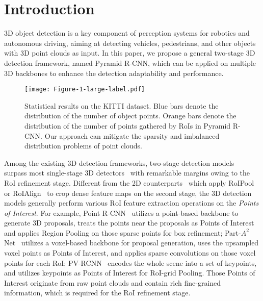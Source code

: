 \documentclass[10pt,twocolumn,letterpaper]{article}
\begin{document}
\section{Introduction}
3D object detection is a key component of perception systems for robotics and autonomous driving, aiming at detecting vehicles, pedestrians, and other objects with 3D point clouds as input. In this paper, we propose a general two-stage 3D detection framework, named Pyramid R-CNN, which can be applied on multiple 3D backbones to enhance the detection adaptability and performance.

\begin{figure}[!t]
\centering
\texttt{[image: Figure-1-large-label.pdf]}
\caption{Statistical results on the KITTI dataset. Blue bars denote the distribution of the number of object points. Orange bars denote the distribution of the number of points gathered by RoIs in Pyramid R-CNN. Our approach can mitigate the sparsity and imbalanced distribution problems of point clouds.}
\label{fig_intro}
\vspace{-6mm}
\end{figure}

Among the existing 3D detection frameworks, two-stage detection models~\cite{yang2019std, shi2020points, shi2020pv, deng2020voxel, shi2021pv} surpass most single-stage 3D detectors~\cite{zhou2018voxelnet, yan2018second, lang2019pointpillars, mao2021one, shi2019pointrcnn} with remarkable margins owing to the RoI refinement stage. Different from the 2D counterparts~\cite{girshick2014rich, girshick2015fast, ren2016faster, he2017mask, cai2018cascade} which apply RoIPool~\cite{girshick2015fast} or RoIAlign~\cite{he2017mask} to crop dense feature maps on the second stage, the 3D detection models generally perform various RoI feature extraction operations on the \textit{Points of Interest}. For example, Point R-CNN~\cite{shi2019pointrcnn} utilizes a point-based backbone to generate 3D proposals, treats the points near the proposals as Points of Interest and applies Region Pooling on those sparse points for box refinement; Part-$A^{2}$ Net~\cite{shi2020points} utilizes a voxel-based backbone for proposal generation, uses the upsampled voxel points as Points of Interest, and applies sparse convolutions on those voxel points for each RoI; PV-RCNN~\cite{shi2020pv} encodes the whole scene into a set of keypoints, and utilizes keypoints as Points of Interest for RoI-grid Pooling. Those Points of Interest originate from raw point clouds and contain rich fine-grained information, which is required for the RoI refinement stage.
\end{document}
